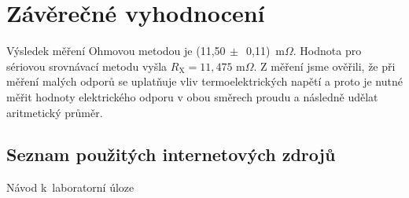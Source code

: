 \documentclass[a4paper,12pt]{article}   %
\newcommand{\tohm}{$\Omega$}
\newcommand{\sub}[1]{_{\text{#1}}}
\newcommand{\rx}{R\sub{X}}
\begin{document}
\section{Závěrečné vyhodnocení}
\label{chap:zaver}
Výsledek měření Ohmovou metodou je (11,50$\,\pm\,$ 0,11)~m\tohm . Hodnota pro sériovou srovnávací metodu vyšla $\rx=11,475$ m\tohm . Z měření jsme ověřili, že při měření malých odporů se uplatňuje vliv termoelektrických napětí a proto je nutné měřit hodnoty elektrického odporu v obou směrech proudu a následně udělat aritmetický průměr.


\clearpage
\renewcommand{\refname}{Seznam použité literatury a~zdrojů informací} 

\begin{thebibliography}{99}

\subsection*{Seznam použitých internetových zdrojů}
     Návod k~laboratorní úloze
    
\end{thebibliography}
\end{document}
